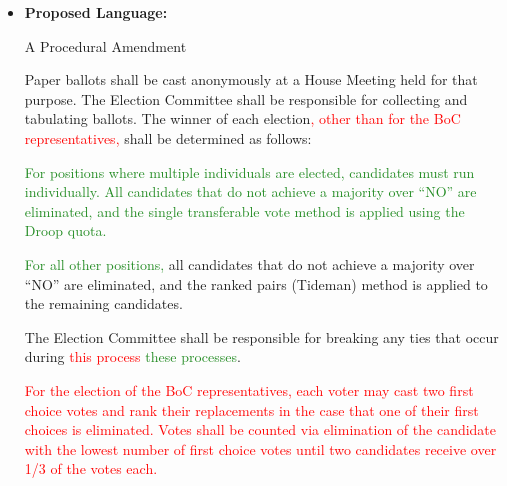 \documentclass[10pt]{article} %
\newcommand{\add}[1]{\textcolor{ForestGreen}{#1}} %
\newcommand{\del}[1]{\textcolor{red}{#1}} %
\begin{document}
\begin{itemize}
    \item \textbf{Proposed Language:}
    
    A Procedural Amendment
    
    Paper ballots shall be cast anonymously at a House Meeting held for that purpose. The Election Committee shall be responsible for collecting and tabulating ballots. The winner of each election\del{, other than for the BoC representatives,} shall be determined as follows:

    \setlength{\leftskip}{5mm}
    \add{For positions where multiple individuals are elected, candidates must run individually. All candidates that do not achieve a majority over ``NO'' are eliminated, and the single transferable vote method is applied using the Droop quota.}
    
    \add{For all other positions,} all candidates that do not achieve a majority over ``NO'' are eliminated, and the ranked pairs (Tideman) method is applied to the remaining candidates.
    
    \setlength{\leftskip}{0mm}
    The Election Committee shall be responsible for breaking any ties that occur during \del{this process} \add{these processes}.

    \del{For the election of the BoC representatives, each voter may cast two first choice votes and rank their replacements in the case that one of their first choices is eliminated. Votes shall be counted via elimination of the candidate with the lowest number of first choice votes until two candidates receive over 1/3 of the votes each.}
\end{itemize}
\end{document}
